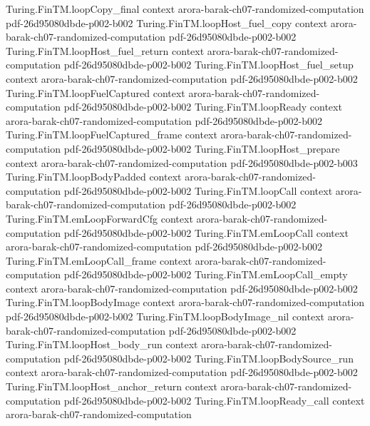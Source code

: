 \begin{theorem}
\proofstep
  {Turing.FinTM.loopCopy_final}
  {context}
  {arora-barak-ch07-randomized-computation}
  {pdf-26d95080dbde-p002-b002}
\proofstep
  {Turing.FinTM.loopHost_fuel_copy}
  {context}
  {arora-barak-ch07-randomized-computation}
  {pdf-26d95080dbde-p002-b002}
\proofstep
  {Turing.FinTM.loopHost_fuel_return}
  {context}
  {arora-barak-ch07-randomized-computation}
  {pdf-26d95080dbde-p002-b002}
\proofstep
  {Turing.FinTM.loopHost_fuel_setup}
  {context}
  {arora-barak-ch07-randomized-computation}
  {pdf-26d95080dbde-p002-b002}
\proofstep
  {Turing.FinTM.loopFuelCaptured}
  {context}
  {arora-barak-ch07-randomized-computation}
  {pdf-26d95080dbde-p002-b002}
\proofstep
  {Turing.FinTM.loopReady}
  {context}
  {arora-barak-ch07-randomized-computation}
  {pdf-26d95080dbde-p002-b002}
\proofstep
  {Turing.FinTM.loopFuelCaptured_frame}
  {context}
  {arora-barak-ch07-randomized-computation}
  {pdf-26d95080dbde-p002-b002}
\proofstep
  {Turing.FinTM.loopHost_prepare}
  {context}
  {arora-barak-ch07-randomized-computation}
  {pdf-26d95080dbde-p002-b003}
\proofstep
  {Turing.FinTM.loopBodyPadded}
  {context}
  {arora-barak-ch07-randomized-computation}
  {pdf-26d95080dbde-p002-b002}
\proofstep
  {Turing.FinTM.loopCall}
  {context}
  {arora-barak-ch07-randomized-computation}
  {pdf-26d95080dbde-p002-b002}
\proofstep
  {Turing.FinTM.emLoopForwardCfg}
  {context}
  {arora-barak-ch07-randomized-computation}
  {pdf-26d95080dbde-p002-b002}
\proofstep
  {Turing.FinTM.emLoopCall}
  {context}
  {arora-barak-ch07-randomized-computation}
  {pdf-26d95080dbde-p002-b002}
\proofstep
  {Turing.FinTM.emLoopCall_frame}
  {context}
  {arora-barak-ch07-randomized-computation}
  {pdf-26d95080dbde-p002-b002}
\proofstep
  {Turing.FinTM.emLoopCall_empty}
  {context}
  {arora-barak-ch07-randomized-computation}
  {pdf-26d95080dbde-p002-b002}
\proofstep
  {Turing.FinTM.loopBodyImage}
  {context}
  {arora-barak-ch07-randomized-computation}
  {pdf-26d95080dbde-p002-b002}
\proofstep
  {Turing.FinTM.loopBodyImage_nil}
  {context}
  {arora-barak-ch07-randomized-computation}
  {pdf-26d95080dbde-p002-b002}
\proofstep
  {Turing.FinTM.loopHost_body_run}
  {context}
  {arora-barak-ch07-randomized-computation}
  {pdf-26d95080dbde-p002-b002}
\proofstep
  {Turing.FinTM.loopBodySource_run}
  {context}
  {arora-barak-ch07-randomized-computation}
  {pdf-26d95080dbde-p002-b002}
\proofstep
  {Turing.FinTM.loopHost_anchor_return}
  {context}
  {arora-barak-ch07-randomized-computation}
  {pdf-26d95080dbde-p002-b002}
\proofstep
  {Turing.FinTM.loopReady_call}
  {context}
  {arora-barak-ch07-randomized-computation}

\end{theorem}
